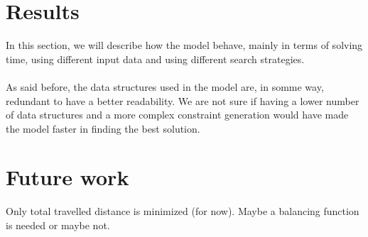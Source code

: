 \documentclass[10pt]{article}
\begin{document}
	\section{Results}
	\label{Results}

	In this section, we will describe how the model behave, mainly in terms of solving
	time, using different input data and using different search strategies.



	\paragraph*{}
	As said before, the data structures used in the model are, in somme way, redundant
	to have a better readability. We are not sure if having a lower number of data 
	structures and a more complex constraint generation would have made the model
	faster in finding the best solution.
	


	\section{Future work}
	\label{Future work}
	Only total travelled distance is minimized (for now). Maybe a balancing 
	function is needed or maybe not.
\end{document}
